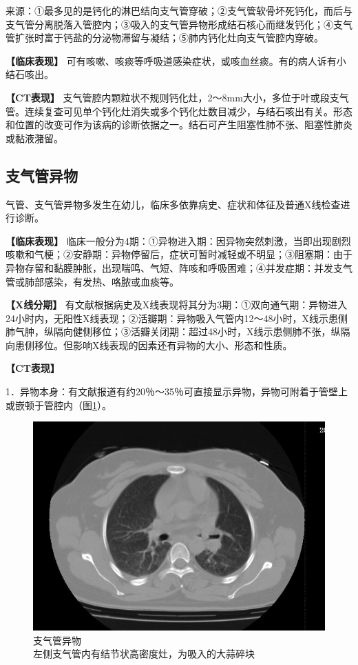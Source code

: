 来源：①最多见的是钙化的淋巴结向支气管穿破；②支气管软骨坏死钙化，而后与支气管分离脱落入管腔内；③吸入的支气管异物形成结石核心而继发钙化；④支气管扩张时富于钙盐的分泌物滞留与凝结；⑤肺内钙化灶向支气管腔内穿破。

\textbf{【临床表现】}
可有咳嗽、咳痰等呼吸道感染症状，或咳血丝痰。有的病人诉有小结石咳出。

\textbf{【CT表现】}
支气管腔内颗粒状不规则钙化灶，2～8mm大小，多位于叶或段支气管。连续复查可见单个钙化灶消失或多个钙化灶数目减少，与结石咳出有关。形态和位置的改变可作为该病的诊断依据之一。结石可产生阻塞性肺不张、阻塞性肺炎或黏液潴留。

\subsection{支气管异物}

气管、支气管异物多发生在幼儿，临床多依靠病史、症状和体征及普通X线检查进行诊断。

\textbf{【临床表现】}
临床一般分为4期：①异物进入期：因异物突然刺激，当即出现剧烈咳嗽和气梗；②安静期：异物停留后，症状可暂时减轻或不明显；③阻塞期：由于异物存留和黏膜肿胀，出现喘鸣、气短、阵咳和呼吸困难；④并发症期：并发支气管或肺部感染，有发热、咯脓或血痰等。

\textbf{【X线分期】}
有文献根据病史及X线表现将其分为3期：①双向通气期：异物进入24小时内，无阳性X线表现；②活瓣期：异物吸入气管内12～48小时，X线示患侧肺气肿，纵隔向健侧移位；③活瓣关闭期：超过48小时，X线示患侧肺不张，纵隔向患侧移位。但影响X线表现的因素还有异物的大小、形态和性质。

\textbf{【CT表现】}

1．异物本身：有文献报道有约20％～35％可直接显示异物，异物可附着于管壁上或嵌顿于管腔内（图\ref{fig9-7}）。

\begin{figure}[!htbp]
 \centering
 \includegraphics[width=.7\textwidth,height=\textheight,keepaspectratio]{./images/Image00190.jpg}
 \captionsetup{justification=centering}
 \caption{支气管异物\\{\small 左侧支气管内有结节状高密度灶，为吸入的大蒜碎块}}
 \label{fig9-7}
  \end{figure} 

